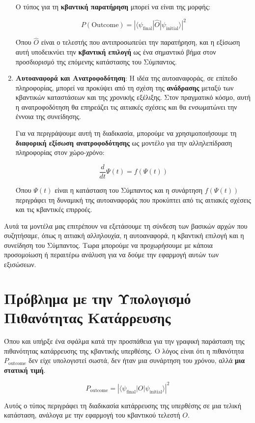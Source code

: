 \documentclass[a4paper,11pt]{article}
\begin{document}
\begin{enumerate}
  Ο τύπος για τη \textbf{κβαντική παρατήρηση} μπορεί να είναι της
  μορφής:

  {{{\[P(\text{Outcome}) = |\langle \psi_{\text{final}} | \hat{O} | \psi_{\text{initial}} \rangle|^2\]}}}

  Όπου {{\(\hat{O}\)}} είναι ο τελεστής που αντιπροσωπεύει την
  παρατήρηση, και η εξίσωση αυτή υποδεικνύει την \textbf{κβαντική
  επιλογή} ως ένα σημαντικό βήμα στον προσδιορισμό της επόμενης
  κατάστασης του Σύμπαντος.
\item
  \textbf{Αυτοαναφορά και Ανατροφοδότηση}: Η ιδέα της αυτοαναφοράς, σε
  επίπεδο πληροφορίας, μπορεί να προκύψει από τη σχέση της
  \textbf{ανάδρασης} μεταξύ των κβαντικών καταστάσεων και της χρονικής
  εξέλιξης. Στον πραγματικό κόσμο, αυτή η ανατροφοδότηση θα επηρεάζει
  τις αιτιακές σχέσεις και θα ενσωματώνει την έννοια της συνείδησης.

  Για να περιγράψουμε αυτή τη διαδικασία, μπορούμε να χρησιμοποιήσουμε
  τη \textbf{διαφορική εξίσωση ανατροφοδότησης} ως μοντέλο για την
  αλληλεπίδραση πληροφορίας στον χώρο-χρόνο:

  {{{\[\frac{d}{dt} \Psi(t) = f(\Psi(t)) \]}}}

  Όπου {{\(\Psi(t)\)}} είναι η κατάσταση του Σύμπαντος και η συνάρτηση
  {{\(f(\Psi(t))\)}} περιγράφει τη δυναμική της αυτοαναφοράς που
  προκύπτει από τις αιτιακές σχέσεις και τις κβαντικές επιρροές.
\end{enumerate}

Αυτά τα μοντέλα μας επιτρέπουν να εξετάσουμε τη σύνδεση των βασικών
αρχών που συζητήσαμε, όπως η αιτιακή αλληλουχία, η αυτοαναφορά, η
κβαντική επιλογή και η συνείδηση του Σύμπαντος. Τωρα μπορούμε να
προχωρήσουμε με κάποια προσομοίωση ή περαιτέρω ανάλυση για να δούμε την
εφαρμογή αυτών των εξισώσεων.
{}
\section*{Πρόβλημα με την Υπολογισμό Πιθανότητας Κατάρρευσης}

Όπου και υπήρξε ένα σφάλμα κατά την προσπάθεια για την γραφική παράσταση της πιθανότητας κατάρρευσης της κβαντικής υπερθέσης. Ο λόγος είναι ότι η πιθανότητα \( P_{\text{outcome}} \) δεν είχε υπολογιστεί σωστά, δεν ήταν μια συνάρτηση του χρόνου, αλλά \textbf{μια στατική τιμή}.

\[
P_{\text{outcome}} = \left| \langle \psi_{\text{final}} | O | \psi_{\text{initial}} \rangle \right|^2
\]

Αυτός ο τύπος περιγράφει τη διαδικασία κατάρρευσης της υπερθέσης σε μια τελική κατάσταση, ανάλογα με την εφαρμογή του κβαντικού τελεστή \( O \).
\end{document}
